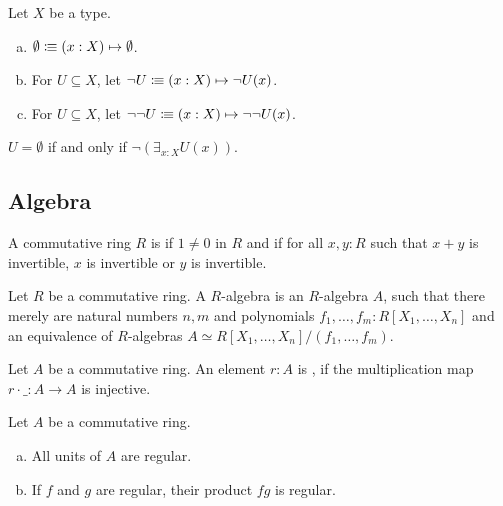 \begin{definition}
  Let $X$ be a type.
  \begin{enumerate}[(a)]
  \item $\emptyset\vcentcolon\mspace{-1.2mu}\equiv (x:X)\mapsto \emptyset$. \index{$\emptyset$}
  \item For $U\subseteq X$, let $\neg U\vcentcolon\mspace{-1.2mu}\equiv (x:X)\mapsto \neg U(x)$. 
  \item For $U\subseteq X$, let $\neg\neg U\vcentcolon\mspace{-1.2mu}\equiv (x:X)\mapsto \neg\neg U(x)$. 
  \end{enumerate}
\end{definition}

\begin{lemma}
  $U=\emptyset$ if and only if $\neg\left(\exists_{x:X}U(x)\right)$.
\end{lemma}

\subsection{Algebra}

\begin{definition}%
  A commutative ring $R$ is  if $1\neq 0$ in $R$ and
  if for all $x,y:R$ such that $x+y$ is invertible, $x$ is invertible or $y$ is invertible.
\end{definition}

\begin{definition}%
  Let $R$ be a commutative ring.
  A  $R$-algebra is an $R$-algebra $A$,
  such that there merely are natural numbers $n,m$ and polynomials $f_1,\dots,f_m:R[X_1,\dots,X_n]$
  and an equivalence of $R$-algebras $A\simeq R[X_1,\dots,X_n]/(f_1,\dots,f_m)$.
\end{definition}

\begin{definition}%
  \label{regular-element}
  Let $A$ be a commutative ring.
  An element $r:A$ is ,
  if the multiplication map $r\cdot\_:A\to A$ is injective.
\end{definition}

\begin{lemma}%
  \label{units-products-regular}
  Let $A$ be a commutative ring.
  \begin{enumerate}[(a)]
  \item All units of $A$ are regular.
  \item If $f$ and $g$ are regular, their product $fg$ is regular.
  \end{enumerate}
\end{lemma}

